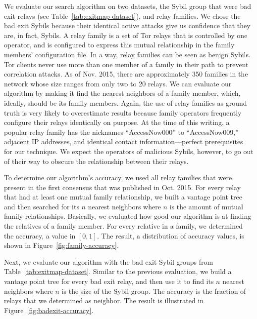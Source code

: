 We evaluate our search algorithm on two datasets, the Sybil group that were
bad exit relays (see Table~\ref{tab:exitmap-dataset}), and relay families.  We
chose the bad exit Sybils because their identical active attacks give us
confidence that they are, in fact, Sybils.  A relay family is a set of Tor
relays that is controlled by one operator, and is configured to express this
mutual relationship in the family members' configuration file.  In a way, relay
families can be seen as benign Sybils.  Tor clients never use more than one
member of a family in their path to prevent correlation attacks.  As of Nov.
2015, there are approximately 350 families in the network whose size ranges from
only two to 20 relays.  We can evaluate our algorithm by making it find the
nearest neighbors of a family member, which, ideally, should be its family
members.  Again, the use of relay families as ground truth is very likely to
overestimate results because family operators frequently configure their relays
identically on purpose.  At the time of this writing, a popular relay family has
the nicknames ``AccessNow000'' to ``AccessNow009,'' adjacent IP addresses, and
identical contact information---perfect prerequisites for our technique.  We
expect the operators of malicious Sybils, however, to go out of their way to
obscure the relationship between their relays.

To determine our algorithm's accuracy, we used all relay families that were
present in the first consensus that was published in Oct. 2015.  For every relay
that had at least one mutual family relationship, we built a vantage point tree and then
searched for its $n$ nearest neighbors where $n$ is the amount of mutual family
relationships.  Basically, we evaluated how good our algorithm is at finding the
relatives of a family member.  For every relative in a family, we determined the
accuracy, a value in $[0,1]$.  The result, a distribution of accuracy values, is
shown in Figure~\ref{fig:family-accuracy}.

Next, we evaluate our algorithm with the bad exit Sybil groups from
Table~\ref{tab:exitmap-dataset}.  Similar to the previous evaluation, we build a
vantage point tree for every bad exit relay, and then use it to find its $n$
nearest neighbors where $n$ is the size of the Sybil group.  The accuracy is the
fraction of relays that we determined as neighbor.  The result is illustrated
in Figure~\ref{fig:badexit-accuracy}.

